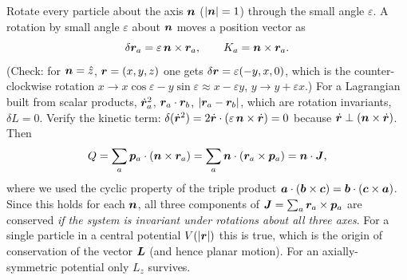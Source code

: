 \documentclass[11pt]{article}
\newcommand{\eps}{\varepsilon}
\begin{document}
\begin{example}
Rotate every particle about the axis $\bm{n}$ ($|\bm{n}|=1$) through the small angle $\eps$. A rotation by small angle $\eps$ about $\bm{n}$ moves a position vector as
\begin{equation}
  \delta\vect r_a=\eps\,\vect n\times\vect r_a,\qquad K_a=\vect n\times\vect r_a .
\end{equation}
(Check: for $\bm{n}=\hat z$, $\bm{r}=(x,y,z)$ one gets $\delta\vect r=\eps(-y,x,0)$, which is the counter-clockwise rotation $x\to x\cos\eps-y\sin\eps\approx x-\eps y$, $y\to y+\eps x$.) For a Lagrangian built from scalar products, $\dot{\bm{r}}_a^2$, $\bm{r}_a\cdot\bm{r}_b$, $|\bm{r}_a-\bm{r}_b|$, which are rotation invariants, $\delta L=0$. Verify the kinetic term: $\delta(\dot{\vect r}^2)=2\dot{\vect r}\cdot(\eps\,\vect n\times\dot{\vect r})=0$ because $\dot{\bm{r}}\perp(\bm{n}\times\dot{\bm{r}})$. Then
\begin{equation}
  Q=\sum_a\bm{p}_a\cdot(\bm{n}\times\bm{r}_a)=\sum_a\bm{n}\cdot(\bm{r}_a\times\bm{p}_a)=\bm{n}\cdot\bm{J} ,
\end{equation}
where we used the cyclic property of the triple product $\bm{a}\cdot(\bm{b}\times\bm{c})=\bm{b}\cdot(\bm{c}\times\bm{a})$. Since this holds for each $\bm{n}$, all three components of $\bm{J}=\sum_a\bm{r}_a\times\bm{p}_a$ are conserved \emph{if the system is invariant under rotations about all three axes}. For a single particle in a central potential $V(|\bm{r}|)$ this is true, which is the origin of conservation of the vector $\bm{L}$ (and hence planar motion). For an axially-symmetric potential only $L_z$ survives.
\end{example}
\end{document}
